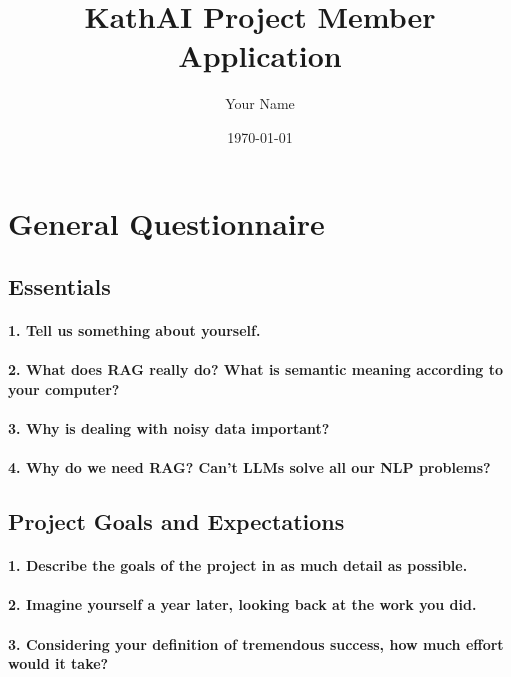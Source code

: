 \documentclass[11pt]{article}
\title{KathAI Project Member Application}
\author{Your Name}
\date{\today}
\begin{document}
\maketitle

\section{General Questionnaire}

\subsection{Essentials}

\paragraph{1. Tell us something about yourself.}
%

\paragraph{2. What does RAG really do? What is semantic meaning according to your computer?}
%

\paragraph{3. Why is dealing with noisy data important?}
%

\paragraph{4. Why do we need RAG? Can't LLMs solve all our NLP problems?}
%

\subsection{Project Goals and Expectations}

\paragraph{1. Describe the goals of the project in as much detail as possible.}
%

\paragraph{2. Imagine yourself a year later, looking back at the work you did.}
%

\paragraph{3. Considering your definition of tremendous success, how much effort would it take?}
%
\end{document}
